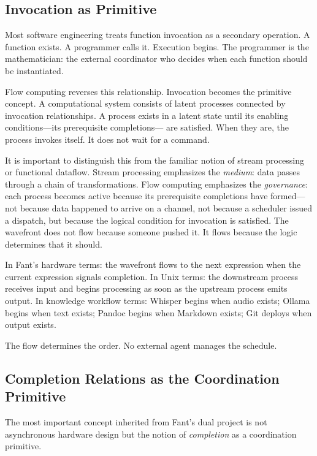 \documentclass[12pt, a4paper]{article}
\begin{document}
\subsection{Invocation as Primitive}

Most software engineering treats function invocation as a secondary
operation. A function exists. A programmer calls it. Execution begins.
The programmer is the mathematician: the external coordinator who
decides when each function should be instantiated.

Flow computing reverses this relationship. Invocation becomes the
primitive concept. A computational system consists of latent processes
connected by invocation relationships. A process exists in a latent
state until its enabling conditions---its prerequisite completions---
are satisfied. When they are, the process invokes itself. It does not
wait for a command.

It is important to distinguish this from the familiar notion of stream
processing or functional dataflow. Stream processing emphasizes the
\emph{medium}: data passes through a chain of transformations. Flow
computing emphasizes the \emph{governance}: each process becomes active
because its prerequisite completions have formed---not because data
happened to arrive on a channel, not because a scheduler issued a
dispatch, but because the logical condition for invocation is satisfied.
The wavefront does not flow because someone pushed it. It flows because
the logic determines that it should.

In Fant's hardware terms: the wavefront flows to the next expression
when the current expression signals completion. In Unix terms: the
downstream process receives input and begins processing as soon as the
upstream process emits output. In knowledge workflow terms: Whisper
begins when audio exists; Ollama begins when text exists; Pandoc begins
when Markdown exists; Git deploys when output exists.

The flow determines the order. No external agent manages the schedule.

\subsection{Completion Relations as the Coordination Primitive}

The most important concept inherited from Fant's dual project is not
asynchronous hardware design but the notion of \emph{completion} as
a coordination primitive.
\end{document}
